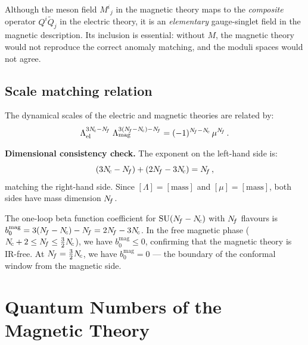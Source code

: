 \documentclass[11pt,a4paper]{article}
\begin{document}
\begin{warningbox}[title={The meson $M$ is elementary in the magnetic theory}]
  Although the meson field $M^i{}_j$ in the magnetic theory maps to the
  \emph{composite} operator $Q^i \widetilde{Q}_j$ in the electric theory, it
  is an \emph{elementary} gauge-singlet field in the magnetic description.
  Its inclusion is essential: without $M$, the magnetic theory would not
  reproduce the correct anomaly matching, and the moduli spaces would
  not agree.
\end{warningbox}

\subsection{Scale matching relation}

The dynamical scales of the electric and magnetic theories are related by:
\begin{equation}\label{eq:scale-matching}
  \Lambda_{\text{el}}^{3\Nc - \Nf}\;
  \Lambda_{\text{mag}}^{3(\Nf - \Nc) - \Nf}
  = (-1)^{\Nf - \Nc}\, \mu^{\Nf}\,.
\end{equation}

\textbf{Dimensional consistency check.}  The exponent on the left-hand side
is:
\[
  (3N_{\!c} - N_{\!f}) + (2N_{\!f} - 3N_{\!c}) = N_{\!f}\,,
\]
matching the right-hand side.  Since $[\Lambda] = [\text{mass}]$ and
$[\mu] = [\text{mass}]$, both sides have mass dimension $N_{\!f}$.\quad\checkmark

\begin{remark}
  The one-loop beta function coefficient for $\mathrm{SU}(N_{\!f} - N_{\!c})$ with $N_{\!f}$
  flavours is $b_0^{\text{mag}} = 3(N_{\!f} - N_{\!c}) - N_{\!f} = 2N_{\!f} - 3N_{\!c}$.
  In the free magnetic phase ($N_{\!c} + 2 \leq N_{\!f} \leq \tfrac{3}{2}N_{\!c}$), we have
  $b_0^{\text{mag}} \leq 0$, confirming that the magnetic theory is IR-free.
  At $N_{\!f} = \tfrac{3}{2}N_{\!c}$, we have $b_0^{\text{mag}} = 0$ --- the boundary
  of the conformal window from the magnetic side.
\end{remark}


\section{Quantum Numbers of the Magnetic Theory}
\label{sec:quantum-numbers}
\end{document}
